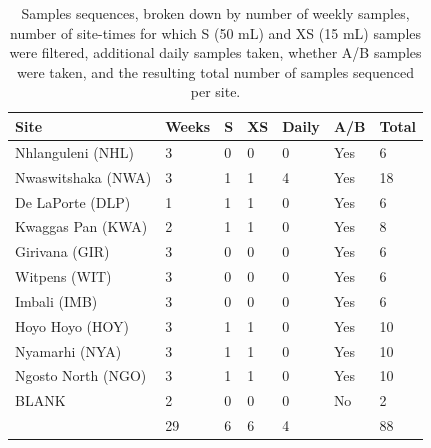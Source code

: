 \begin{table}[h!]
\centering
\begin{tabular}{llllll|l}
  \hline
  \hline
  Site & Weeks & S & XS & Daily & A/B & Total\\
  \hline
  Nhlanguleni (NHL) 	& 3 & 0 & 0 & 0 & Yes & 6 \\ 
  Nwaswitshaka (NWA) 	& 3 & 1 & 1 & 4 & Yes & 18 \\ 
  De LaPorte (DLP) 		& 1 & 1 & 1 & 0 & Yes & 6 \\ 
  Kwaggas Pan (KWA) 	& 2 & 1 & 1 & 0 & Yes & 8\\ 
  Girivana (GIR) 		& 3 & 0 & 0 & 0 & Yes & 6 \\ 
  Witpens (WIT) 		& 3 & 0 & 0 & 0 & Yes & 6 \\ 
  Imbali (IMB) 			& 3 & 0 & 0 & 0 & Yes & 6 \\ 
  Hoyo Hoyo (HOY) 		& 3 & 1 & 1 & 0 & Yes & 10 \\ 
  Nyamarhi (NYA) 		& 3 & 1 & 1 & 0 & Yes & 10 \\ 
  Ngosto North (NGO) 	& 3 & 1 & 1 & 0 & Yes &10 \\ 
  BLANK 				& 2 & 0 & 0 & 0 & No & 2 \\ 
  \hline
   						& 29 & 6 & 6 & 4 & & 88 \\
  \hline
  \hline
\end{tabular}
\caption{Samples sequences, broken down by number of weekly samples, number of site-times for which S (50 mL) and XS (15 mL) samples were filtered, additional daily samples taken, whether A/B samples were taken, and the resulting total number of samples sequenced per site.}
\label{tab:samples}
\end{table}
